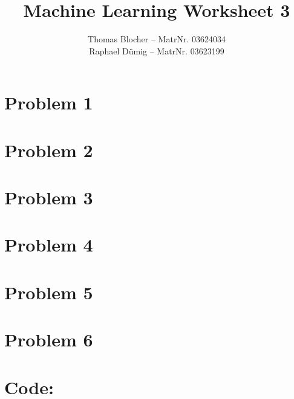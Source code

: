 \documentclass{scrartcl}
\title{Machine Learning Worksheet 3}
\author{Thomas Blocher -- MatrNr. 03624034 \\ Raphael D\"umig -- MatrNr. 03623199}
\begin{document}
\maketitle

\section*{Problem 1}


\section*{Problem 2}


\section*{Problem 3}


\section*{Problem 4}


\section*{Problem 5}


\section*{Problem 6}


\section*{Code:}



\end{document}
